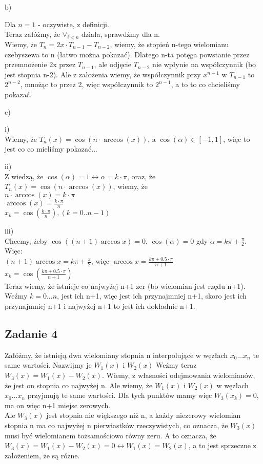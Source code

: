 \documentclass[a4paper]{article}
\begin{document}
\Large b) \normalsize

Dla $n=1$ - oczywiste, z definicji.\\
Teraz załóżmy, że $\forall_{i<n}$ działa, sprawdźmy dla n.\\
Wiemy, że $T_{n}=2x\cdot T_{n-1} - T_{n-2}$, wiemy, że stopień n-tego wielomianu czebyszewa to n (łatwo można pokazać). Dlatego n-ta potęga powstanie przez przemnożenie 2x przez $T_{n-1}$, ale odjęcie $T_{n-2}$ nie wpłynie na współczynnik (bo jest stopnia n-2). Ale z założenia wiemy, że współczynnik przy $x^{n-1}$ w $T_{n-1}$ to $2^{n-2}$, mnożąc to przez 2, więc współczynnik to $2^{n-1}$, a to to co chcieliśmy pokazać.

\Large c) \normalsize

\large i)\\ \normalsize 
Wiemy, że $T_n(x)=\cos(n\cdot \arccos(x))$, a $\cos(\alpha) \in [-1,1]$, więc to jest co co mieliśmy pokazać...

\large ii)\\ \normalsize 
Z wiedzą, że $\cos(\alpha)=1 \leftrightarrow \alpha=k\cdot \pi$, oraz, że $T_n(x)=\cos(n\cdot \arccos(x))$, wiemy, że\\
$n\cdot \arccos(x) = k\cdot \pi$\\
$\arccos(x) = \frac{k\cdot \pi}{n}$\\
$x_k=\cos(\frac{k\cdot \pi}{n}), (k=0..n-1)$

\large iii)\\ \normalsize 
Chcemy, żeby $\cos((n+1)\arccos x) = 0$. $\cos(\alpha)=0$ gdy $\alpha=k\pi + \frac{\pi}{2}$. Więc:\\
\Large $ (n+1)\arccos x = k\pi + \frac{\pi}{2}$, więc $\arccos x = \frac{k\pi + 0.5\cdot \pi}{n+1} $  \\
$x_k=\cos(\frac{k\pi + 0.5\cdot \pi}{n+1}) $\\
\normalsize
Teraz wiemy, że istnieje co najwyżej n+1 zer (bo wielomian jest rzędu n+1). Weźmy $k=0...n$, jest ich n+1, więc jest ich przynajmniej n+1, skoro jest ich przynajmniej n+1 i najwyżej n+1 to jest ich dokładnie n+1.

\clearpage
\subsection*{Zadanie 4}
Załóżmy, że istnieją dwa wielomiany stopnia n interpolujące w węzłach $x_0...x_n$ te same wartości. Nazwijmy je $W_1(x)$ i $W_2(x)$
Weźmy teraz $W_3(x)=W_1(x)-W_2(x)$. Wiemy, z własności odejmowania wielomianów, że jest on stopnia co najwyżej n. Ale wiemy, że $W_1(x)$ i $W_2(x)$ w węzłach $x_0...x_n$ przyjmują te same wartości. Dla tych punktów mamy więc $W_3(x_k)=0$, ma on więc n+1 miejsc zerowych.\\
Ale $W_3(x)$ jest stopnia nie większego niż n, a każdy niezerowy wielomian stopnia n ma co najwyżej n pierwiastków rzeczywistych, co oznacza, że $W_3(x)$ musi być wielomianem tożsamościowo równy zeru. A to oznacza, że$ W_3(x)=W_1(x)-W_2(x)=0 \leftrightarrow W_1(x)=W_2(x)$, a to jest sprzeczne z założeniem, że są różne.
\end{document}
